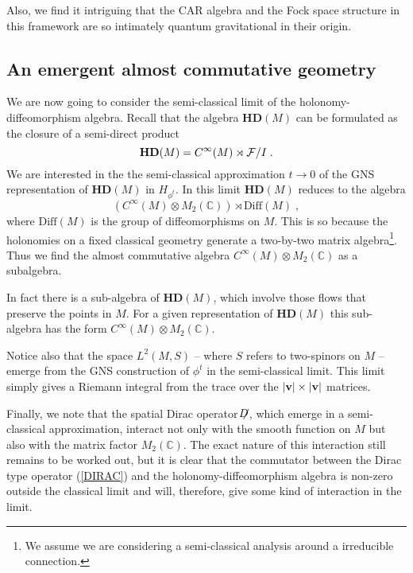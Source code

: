 \documentclass[12pt]{article}
\newcommand{\cF}{{\cal F}}
\begin{document}
Also, we find it intriguing that the CAR algebra and the Fock space structure in this framework are so intimately quantum gravitational in their origin. %



\subsection{An emergent almost commutative geometry}

We are now going to consider the semi-classical limit of the holonomy-diffeomorphism algebra.
Recall that the algebra $\mathbf{HD}(M) $ can be formulated as the closure of a semi-direct product
$$
\mathbf{HD}(M)  = C^\infty(M)  \rtimes  \cF  / I\;.
$$
We are interested in the the semi-classical approximation $t\rightarrow 0$ of the GNS representation of $\mathbf{HD}(M) $ in $H_{\phi^t} $. In this limit $\mathbf{HD}(M) $ reduces to the algebra
\begin{equation}
 \left(C^\infty(M)\otimes M_2(\mathbb{C})\right) \rtimes \mbox{Diff}(M)\;,
\label{almost}
\end{equation}
where $\mbox{Diff}(M)$ is the group of diffeomorphisms on $M$. This is so because the holonomies on a fixed classical geometry generate a two-by-two matrix algebra\footnote{We assume we are considering a semi-classical analysis around a irreducible connection.}.
Thus we find the almost commutative algebra $C^\infty(M)\otimes M_2(\mathbb{C}) $ as a subalgebra.

In fact there is a sub-algebra of $ \mathbf{HD}(M)$, which involve those flows that preserve the points in $M$. For a given representation of  $ \mathbf{HD}(M)$ this sub-algebra has the form $C^\infty(M)\otimes M_2(\mathbb{C}) $.


Notice also that the space $L^2(M,S)$ -- where $S$ refers to two-spinors on $M$ -- emerge from the GNS construction of $\phi^t$ in the semi-classical limit. This limit simply gives a Riemann integral from the trace over the $\vert {\bf v} \vert \times \vert {\bf v} \vert $ matrices.

Finally, we note that the spatial Dirac operator $\not\hspace{-1.9mm}D$, which emerge in a semi-classical approximation, interact not only with the smooth function on $M$ but also with the matrix factor $M_2(\mathbb{C})$. The exact nature of this interaction still remains to be worked out, but it is clear that the commutator between the Dirac type operator (\ref{DIRAC}) and the holonomy-diffeomorphism algebra is non-zero outside the classical limit and will, therefore, give some kind of interaction in the limit.
\end{document}
